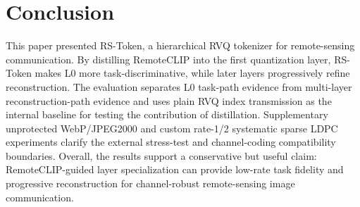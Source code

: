 \documentclass[lettersize,journal]{IEEEtran}
\begin{document}
\section{Conclusion}
This paper presented RS-Token, a hierarchical RVQ tokenizer for remote-sensing communication. By distilling RemoteCLIP into the first quantization layer, RS-Token makes L0 more task-discriminative, while later layers progressively refine reconstruction. The evaluation separates L0 task-path evidence from multi-layer reconstruction-path evidence and uses plain RVQ index transmission as the internal baseline for testing the contribution of distillation. Supplementary unprotected WebP/JPEG2000 and custom rate-1/2 systematic sparse LDPC experiments clarify the external stress-test and channel-coding compatibility boundaries. Overall, the results support a conservative but useful claim: RemoteCLIP-guided layer specialization can provide low-rate task fidelity and progressive reconstruction for channel-robust remote-sensing image communication.


\end{document}
